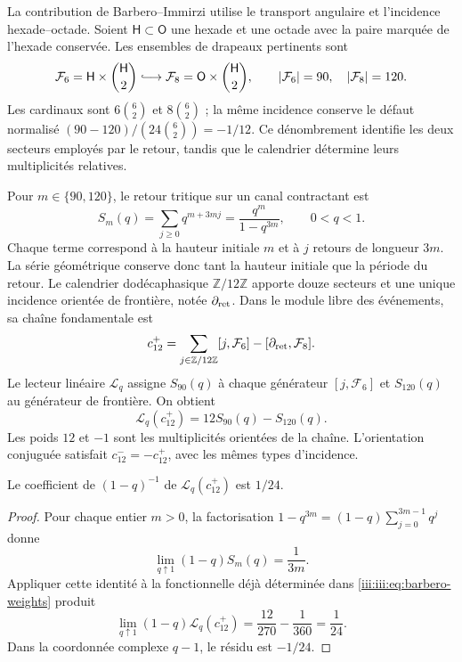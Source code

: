 La contribution de Barbero--Immirzi utilise le transport angulaire et
l’incidence hexade--octade. Soient $\mathsf H\subset\mathsf O$ une hexade
et une octade avec la paire marquée de l’hexade conservée. Les ensembles de
drapeaux pertinents sont
\begin{equation}
 \mathcal F_6=\mathsf H\times\binom{\mathsf H}{2}
 \lhook\joinrel\longrightarrow
 \mathcal F_8=\mathsf O\times\binom{\mathsf H}{2},
 \qquad |\mathcal F_6|=90,\quad |\mathcal F_8|=120.
 \label{iii:iii:eq:barbero-flags}
\end{equation}
Les cardinaux sont $6\binom62$ et $8\binom62$ ; la même incidence
conserve le défaut normalisé
$(90-120)/(24\binom62)=-1/12$. Ce dénombrement identifie les deux secteurs
employés par le retour, tandis que le calendrier détermine leurs
multiplicités relatives.

Pour $m\in\{90,120\}$, le retour tritique sur un canal contractant est
\begin{equation}
 S_m(q)=\sum_{j\geq0}q^{m+3mj}
       =\frac{q^m}{1-q^{3m}},\qquad 0<q<1.
 \label{iii:iii:eq:barbero-return-series}
\end{equation}
Chaque terme correspond à la hauteur initiale $m$ et à $j$ retours de
longueur $3m$. La série géométrique conserve donc tant la hauteur
initiale que la période du retour. Le calendrier dodécaphasique
$\mathbb Z/12\mathbb Z$ apporte douze secteurs et une unique incidence
orientée de frontière, notée $\partial_{\rm ret}$. Dans le module
libre des événements, sa chaîne fondamentale est
\begin{equation}
 c_{12}^{+}
 =\sum_{j\in\mathbb Z/12\mathbb Z}[j,\mathcal F_6]
  -[\partial_{\rm ret},\mathcal F_8].
 \label{iii:iii:eq:barbero-cycle}
\end{equation}
Le lecteur linéaire $\mathscr L_q$ assigne $S_{90}(q)$ à chaque générateur
$[j,\mathcal F_6]$ et $S_{120}(q)$ au générateur de frontière. On obtient
\begin{equation}
 \mathscr L_q(c_{12}^{+})=12S_{90}(q)-S_{120}(q).
 \label{iii:iii:eq:barbero-weights}
\end{equation}
Les poids $12$ et $-1$ sont les multiplicités orientées de la chaîne.
L’orientation conjuguée satisfait $c_{12}^{-}=-c_{12}^{+}$, avec les
mêmes types d’incidence.

\begin{proposition}
\label{iii:iii:prop:barbero-pole}
Le coefficient de $(1-q)^{-1}$ de
$\mathscr L_q(c_{12}^{+})$ est $1/24$.
\end{proposition}
\begin{proof}
Pour chaque entier $m>0$, la factorisation
$1-q^{3m}=(1-q)\sum_{j=0}^{3m-1}q^j$ donne
\[
 \lim_{q\uparrow1}(1-q)S_m(q)=\frac1{3m}.
\]
Appliquer cette identité à la fonctionnelle déjà déterminée dans
\eqref{iii:iii:eq:barbero-weights} produit
\begin{equation}
 \lim_{q\uparrow1}(1-q)\mathscr L_q(c_{12}^{+})
 =\frac{12}{270}-\frac1{360}=\frac1{24}.
 \label{iii:iii:eq:barbero-pole}
\end{equation}
Dans la coordonnée complexe $q-1$, le résidu est $-1/24$.
\end{proof}

